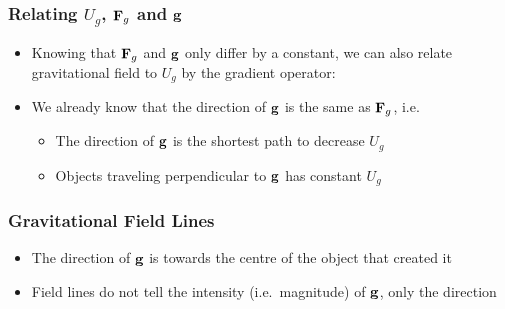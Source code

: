 \documentclass[12pt,compress,aspectratio=169]{beamer}
\newcommand{\pic}[2]{\texttt{[image: \#2]}}
\newcommand{\mb}[1]{\ensuremath\mathbf{#1}}
\begin{document}
%
%
\begin{frame}
  \frametitle{Relating $U_g$, $\mb{F}_g$ and $\mb{g}$}
  \begin{itemize}
  \item Knowing that $\mb{F}_g$ and $\mb{g}$ only differ by a constant, we can
    also relate gravitational field to $U_g$ by the gradient operator:

    \vspace{-0.1in}{\Large
      \begin{displaymath}
        \mb{g}=\frac{\mb{F}_g}{m}=-\nabla\left(\frac{U_g}{m}\right)=
        -\frac{\partial}{\partial r}\left(\frac{U_g}{m}\right)
        \hat{\mb{r}}
      \end{displaymath}
    }
  \item We already know that the direction of $\mb{g}$ is the same as
    $\mb{F}_g$, i.e.\
    \begin{itemize}
    \item The direction of $\mb{g}$ is the shortest path to decrease $U_g$ 
    \item Objects traveling perpendicular to $\mb{g}$ has constant $U_g$
    \end{itemize}
  \end{itemize}
\end{frame}


\begin{frame}
  \frametitle{Gravitational Field Lines}
  \begin{center}
  \end{center}
  \begin{itemize}
  \item The direction of $\mb{g}$ is towards the centre of the object that
    created it
  \item Field lines do not tell the intensity (i.e.\ magnitude) of $\mb{g}$,
    only the direction
  \end{itemize}
\end{frame}
\end{document}
